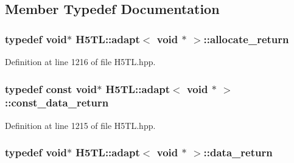 \subsection{Member Typedef Documentation}
\hypertarget{struct_h5_t_l_1_1adapt_3_01void_01_5_01_4_ae25684c819a12a21c43243c76650cb08}{
\subsubsection[{allocate\-\_\-return}]{\setlength{\rightskip}{0pt plus 5cm}typedef void$\ast$ {\bf H5\-T\-L\-::adapt}$<$ void $\ast$ $>$\-::{\bf allocate\-\_\-return}}}\label{struct_h5_t_l_1_1adapt_3_01void_01_5_01_4_ae25684c819a12a21c43243c76650cb08}


Definition at line 1216 of file H5\-T\-L.\-hpp.

\hypertarget{struct_h5_t_l_1_1adapt_3_01void_01_5_01_4_af1fde85ce8f3296282fe22e6ee5b9c46}{
\subsubsection[{const\-\_\-data\-\_\-return}]{\setlength{\rightskip}{0pt plus 5cm}typedef const void$\ast$ {\bf H5\-T\-L\-::adapt}$<$ void $\ast$ $>$\-::{\bf const\-\_\-data\-\_\-return}}}\label{struct_h5_t_l_1_1adapt_3_01void_01_5_01_4_af1fde85ce8f3296282fe22e6ee5b9c46}


Definition at line 1215 of file H5\-T\-L.\-hpp.

\hypertarget{struct_h5_t_l_1_1adapt_3_01void_01_5_01_4_a4c6e9d65ebdbec1d46d20fc905c4e4cb}{
\subsubsection[{data\-\_\-return}]{\setlength{\rightskip}{0pt plus 5cm}typedef void$\ast$ {\bf H5\-T\-L\-::adapt}$<$ void $\ast$ $>$\-::{\bf data\-\_\-return}}}\label{struct_h5_t_l_1_1adapt_3_01void_01_5_01_4_a4c6e9d65ebdbec1d46d20fc905c4e4cb}


